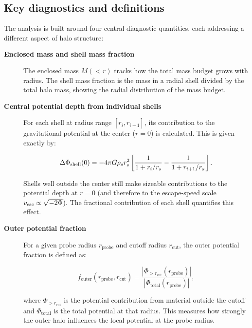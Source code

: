\subsection{Key diagnostics and definitions}

The analysis is built around four central diagnostic quantities, each addressing a different aspect of halo structure:

\begin{description}

\item[\textbf{Enclosed mass and shell mass fraction}]
The enclosed mass $M(<r)$ tracks how the total mass budget grows with radius. The shell mass fraction is the mass in a radial shell divided by the total halo mass, showing the radial distribution of the mass budget.

\item[\textbf{Central potential depth from individual shells}]
For each shell at radius range $[r_i, r_{i+1}]$, its contribution to the gravitational potential at the center ($r = 0$) is calculated. This is given exactly by:

\begin{equation}
\Delta\Phi_{\rm shell}(0) = -4\pi G \rho_s r_s^2 \left[ \frac{1}{1 + r_i/r_s} - \frac{1}{1 + r_{i+1}/r_s} \right].
\end{equation}

Shells well outside the center still make sizeable contributions to the potential depth at $r = 0$ (and therefore to the escape-speed scale $v_{\rm esc} \propto \sqrt{-2\Phi}$). The fractional contribution of each shell quantifies this effect.

\item[\textbf{Outer potential fraction}]
For a given probe radius $r_{\mathrm{probe}}$ and cutoff radius $r_{\mathrm{cut}}$, the outer potential fraction is defined as:

\begin{equation}
f_{\mathrm{outer}}(r_{\mathrm{probe}}, r_{\mathrm{cut}}) = \frac{\left|\Phi_{>r_{\mathrm{cut}}}(r_{\mathrm{probe}})\right|}{\left|\Phi_{\mathrm{total}}(r_{\mathrm{probe}})\right|},
\end{equation}

where $\Phi_{>r_{\mathrm{cut}}}$ is the potential contribution from material outside the cutoff and $\Phi_{\mathrm{total}}$ is the total potential at that radius. This measures how strongly the outer halo influences the local potential at the probe radius.

\end{description}

